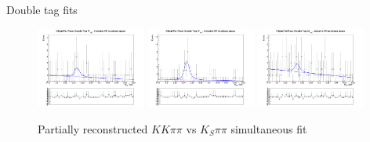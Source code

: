 \documentclass{beamer}
\begin{document}
\begin{frame}{Double tag fits}
\begin{figure}
    \includegraphics[width=0.32\textwidth, clip = true, trim = {0 11cm 0 0}]{Plots/DoubleTagYield_DoubleTag_SCMB_KKpipi_vs_KSpipiPartReco_SignalBin0_TagBin6.png}
    \includegraphics[width=0.32\textwidth, clip = true, trim = {0 11cm 0 0}]{Plots/DoubleTagYield_DoubleTag_SCMB_KKpipi_vs_KSpipiPartReco_SignalBin0_TagBin7.png}
    \includegraphics[width=0.32\textwidth, clip = true, trim = {0 11cm 0 0}]{Plots/DoubleTagYield_DoubleTag_SCMB_KKpipi_vs_KSpipiPartReco_SignalBin0_TagBin8.png}
    \caption{Partially reconstructed $KK\pi\pi$ vs $K_S\pi\pi$ simultaneous fit}
  \end{figure}
\end{frame}
\end{document}
